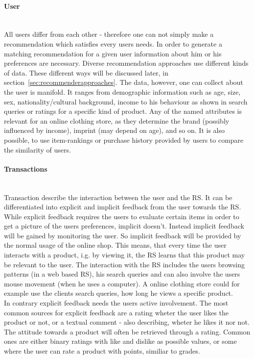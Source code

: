 \paragraph{User}~\\
All users differ from each other - therefore one can not simply make a recommendation which satisfies every users needs.
In order to generate a matching recommendation for a given user information about him or his preferences are necessary.
Diverse recommendation approaches use different kinds of data.
These different ways will be discussed later, in section~\ref{sec:recommenderapproaches}.
The data, however, one can collect about the user is manifold.
It ranges from demographic information such as age, size, sex, nationality/cultural background, income to his behaviour as shown in search queries or ratings for a specific kind of product.
Any of the named attributes is relevant for an online clothing store, as they determine the brand (possibly influenced by income), imprint (may depend on age), and so on.\citep[p.8-9]{ricci:2011}
It is also possible, to use item-rankings or purchase history provided by users to compare the similarity of users.\citep[p.~377-378]{pradel:2011}

\paragraph{Transactions}~\\
\label{sec:feedback}
Transaction describe the interaction between the user and the RS.\citep[p.~9]{ricci:2011}
It can be differentiated into explicit and implicit feedback from the user towards the RS.
While explicit feedback requires the users to evaluate certain items in order to get a picture of the users preferences, implicit doesn't.
Instead implicit feedback will be gained by monitoring the user.\citep[p.~76-77]{lops:2011}
So implicit feedback will be provided by the normal usage of the online shop.
This means, that every time the user interacts with a product, i.g. by viewing it, the RS learns that this product may be relevant to the user.\citep{taghipour:2007}
The interaction with the RS includes the users browsing patterns (in a web based RS), his search queries and can also involve the users mouse movement (when he uses a computer).\citep[p.~146]{koren:2011}
A online clothing store could for example use the clients search queries, how long he views a specific product.\\
In contrary explicit feedback needs the users active involvement.
The most common sources for explicit feedback are a rating wheter the user likes the product or not, or a textual comment - also describing, wheter he likes it nor not.
The attitude towards a product will often be retrieved through a rating.
Common ones are either binary ratings with like and dislike as possible values, or some where the user can rate a product with points, similiar to grades.\citep[p.~77]{lops:2011}


